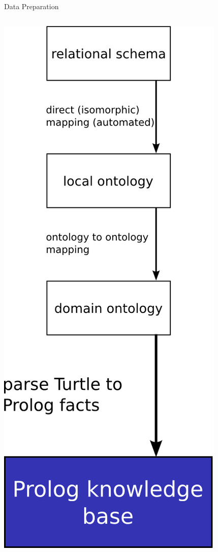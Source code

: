 \documentclass{beamer}
\begin{document}
\begin{frame}{Data Preparation}
\begin{columns}
\begin{column}{.3\textwidth}
\includegraphics[width=\textwidth,height=.88\textheight,keepaspectratio]{prologkb}

\end{column}
\end{columns}
\end{frame}
\end{document}
